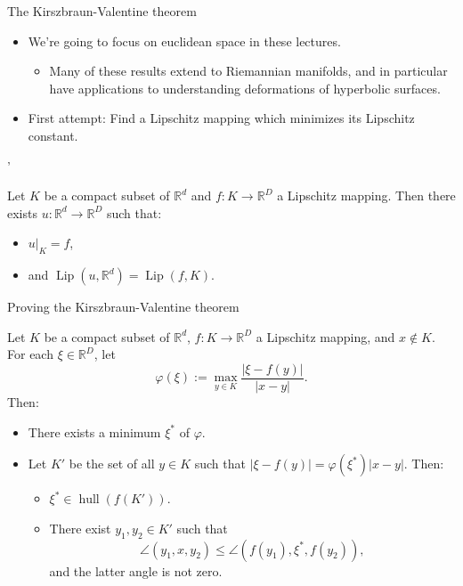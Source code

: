 \documentclass[10pt]{beamer}
\newcommand{\RR}{\mathbb{R}}
\DeclareMathOperator{\Lip}{Lip}
\DeclareMathOperator{\hull}{hull}
\begin{document}
\begin{frame}{The Kirszbraun-Valentine theorem}
\begin{itemize}
\item We're going to focus on euclidean space in these lectures.
\begin{itemize}
\item Many of these results extend to Riemannian manifolds, and in particular have applications to understanding deformations of hyperbolic surfaces. 
\end{itemize}
\item First attempt: Find a Lipschitz mapping which minimizes its Lipschitz constant. 
\end{itemize}
'
\begin{theorem}
Let $K$ be a compact subset of $\RR^d$ and $f: K \to \RR^D$ a Lipschitz mapping.
Then there exists $u: \RR^d \to \RR^D$ such that: 
\begin{itemize}
\item $u|_K = f$, 
\item and $\Lip(u, \RR^d) = \Lip(f, K)$.
\end{itemize}
\end{theorem}
\end{frame}

\begin{frame}{Proving the Kirszbraun-Valentine theorem}
\begin{lemma}
Let $K$ be a compact subset of $\RR^d$, $f: K \to \RR^D$ a Lipschitz mapping, and $x \notin K$.
For each $\xi \in \RR^D$, let 
$$\varphi(\xi) := \max_{y \in K} \frac{|\xi - f(y)|}{|x - y|}.$$
Then: 
\begin{itemize}
\item There exists a minimum $\xi^*$ of $\varphi$. 
\item Let $K'$ be the set of all $y \in K$ such that $|\xi - f(y)| = \varphi(\xi^*) |x - y|$. Then: 
\begin{itemize}
\item $\xi^* \in \hull(f(K'))$. 
\item There exist $y_1, y_2 \in K'$ such that 
$$\angle(y_1, x, y_2) \leq \angle(f(y_1), \xi^*, f(y_2)),$$
and the latter angle is not zero.
\end{itemize}
\end{itemize}
\end{lemma}
\end{frame}
\end{document}
